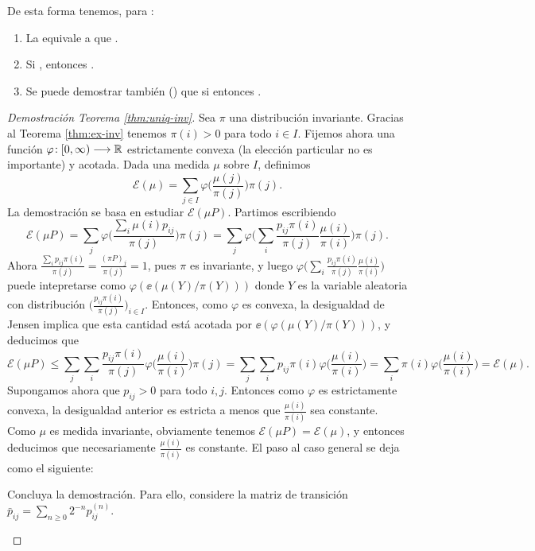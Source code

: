 De esta forma tenemos, para :
\begin{enumerate}[label=\arabic*.]
\item La  equivale a que .
\item Si , entonces .
\item Se puede demostrar también (\ucmark) que si  entonces .
\end{enumerate}

\begin{proof}[Demostración Teorema \ref{thm:uniq-inv}]
Sea $\pi$ una distribución invariante.
Gracias al Teorema \ref{thm:ex-inv} tenemos $\pi(i)>0$ para todo $i\in I$.
Fijemos ahora una función $\varphi\!:[0,\infty)\longrightarrow\mathbb{R}$ estrictamente convexa (la elección particular no es importante) y acotada.
Dada una medida $\mu$ sobre $I$, definimos
\[\mathcal{E}(\mu)=\sum_{j\in I}\varphi\Big(\frac{\mu(j)}{\pi(j)}\Big)\pi(j).\]
La demostración se basa en estudiar $\mathcal{E}(\mu P)$.
Partimos escribiendo
\[\mathcal{E}(\mu P)=\sum_{j}\varphi\Big(\frac{\sum_i\mu(i)p_{ij}}{\pi(j)}\Big)\pi(j)
=\sum_{j}\varphi\Big(\sum_i\frac{p_{ij}\pi(i)}{\pi(j)}\frac{\mu(i)}{\pi(i)}\Big)\pi(j).\]
Ahora $\frac{\sum_ip_{ij}\pi(i)}{\pi(j)}=\frac{(\pi P)_j}{\pi(j)}=1$, pues $\pi$ es invariante, y luego $\varphi\Big(\sum_i\frac{p_{ij}\pi(i)}{\pi(j)}\frac{\mu(i)}{\pi(i)}\Big)$ puede intepretarse como $\varphi(\ee(\mu(Y)/\pi(Y)))$ donde $Y$ es la variable aleatoria con distribución $\big(\frac{p_{ij}\pi(i)}{\pi(j)}\big)_{i\in I}$.
Entonces, como $\varphi$ es convexa, la desigualdad de Jensen implica que esta cantidad está acotada por $\ee(\varphi(\mu(Y)/\pi(Y)))$, y deducimos que
\[\mathcal{E}(\mu P)\leq\sum_{j}\sum_i\frac{p_{ij}\pi(i)}{\pi(j)}\varphi\Big(\frac{\mu(i)}{\pi(i)}\Big)\pi(j)=\sum_{j}\sum_ip_{ij}\pi(i)\varphi\Big(\frac{\mu(i)}{\pi(i)}\Big)
=\sum_i\pi(i)\varphi\Big(\frac{\mu(i)}{\pi(i)}\Big)=\mathcal{E}(\mu).\]
Supongamos ahora que $p_{ij}>0$ para todo $i,j$.
Entonces como $\varphi$ es estrictamente convexa, la desigualdad anterior es estricta a menos que $\frac{\mu(i)}{\pi(i)}$ sea constante.
Como $\mu$ es medida invariante, obviamente tenemos $\mathcal{E}(\mu P)=\mathcal{E}(\mu)$, y entonces deducimos que necesariamente $\frac{\mu(i)}{\pi(i)}$ es constante.
El paso al caso general se deja como el siguiente:
\begin{exer}
Concluya la demostración.
Para ello, considere la matriz de transición $\bar p_{ij}=\sum_{n\geq0}2^{-n}p^{(n)}_{ij}$.\qedhere
\end{exer}
\end{proof}


